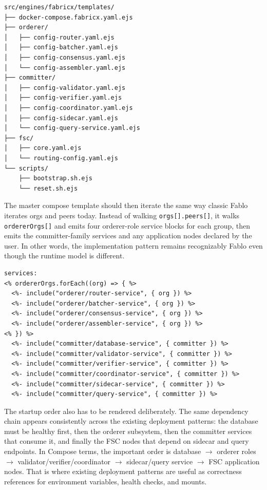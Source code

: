 \begin{tcolorbox}[colback=gray!5!white, colframe=gray!50!black,
  title=Planned Fabric-X template tree,
  fonttitle=\bfseries, arc=4pt]
\begin{lstlisting}[language={}, basicstyle=\ttfamily\footnotesize]
src/engines/fabricx/templates/
├── docker-compose.fabricx.yaml.ejs
├── orderer/
│   ├── config-router.yaml.ejs
│   ├── config-batcher.yaml.ejs
│   ├── config-consensus.yaml.ejs
│   └── config-assembler.yaml.ejs
├── committer/
│   ├── config-validator.yaml.ejs
│   ├── config-verifier.yaml.ejs
│   ├── config-coordinator.yaml.ejs
│   ├── config-sidecar.yaml.ejs
│   └── config-query-service.yaml.ejs
├── fsc/
│   ├── core.yaml.ejs
│   └── routing-config.yaml.ejs
└── scripts/
    ├── bootstrap.sh.ejs
    └── reset.sh.ejs
\end{lstlisting}
\end{tcolorbox}

The master compose template should then iterate the same way classic Fablo iterates orgs and peers today. Instead of walking \texttt{orgs[].peers[]}, it walks \texttt{ordererOrgs[]} and emits four orderer-role service blocks for each group, then emits the committer-family services and any application nodes declared by the user. In other words, the implementation pattern remains recognizably Fablo even though the runtime model is different.

\begin{tcolorbox}[colback=gray!5!white, colframe=gray!50!black,
  title=Master Fabric-X compose iteration (illustrative),
  fonttitle=\bfseries, arc=4pt]
\begin{lstlisting}[language=ejs, basicstyle=\ttfamily\footnotesize]
services:
<% ordererOrgs.forEach((org) => { %>
  <%- include("orderer/router-service", { org }) %>
  <%- include("orderer/batcher-service", { org }) %>
  <%- include("orderer/consensus-service", { org }) %>
  <%- include("orderer/assembler-service", { org }) %>
<% }) %>
  <%- include("committer/database-service", { committer }) %>
  <%- include("committer/validator-service", { committer }) %>
  <%- include("committer/verifier-service", { committer }) %>
  <%- include("committer/coordinator-service", { committer }) %>
  <%- include("committer/sidecar-service", { committer }) %>
  <%- include("committer/query-service", { committer }) %>
\end{lstlisting}
\end{tcolorbox}

The startup order also has to be rendered deliberately. The same dependency chain appears consistently across the existing deployment patterns: the database must be healthy first, then the orderer subsystem, then the committer services that consume it, and finally the FSC nodes that depend on sidecar and query endpoints. In Compose terms, the important order is database $\rightarrow$ orderer roles $\rightarrow$ validator/verifier/coordinator $\rightarrow$ sidecar/query service $\rightarrow$ FSC application nodes. That is where existing deployment patterns are useful as correctness references for environment variables, health checks, and mounts.

